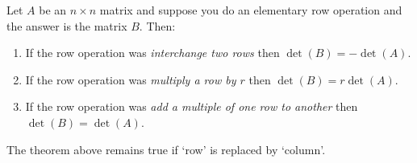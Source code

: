\begin{theorem}
Let $A$ be an $n\times n$ matrix and suppose you do an elementary
row operation and the answer is the matrix $B$.  Then:
\begin{enumerate}[(1)]
\item If the row operation was \emph{interchange two rows}
then $\det(B) = -\det(A)$.
\item If the row operation was \emph{multiply a row by $r$}
then $\det(B) = r\det(A)$.
\item If the row operation was \emph{add a multiple of one row to 
another} then $\det(B) = \det(A)$.
\end{enumerate}
\end{theorem}
\begin{remark} The theorem above remains true if `row' is replaced by `column'. 
\end{remark}
